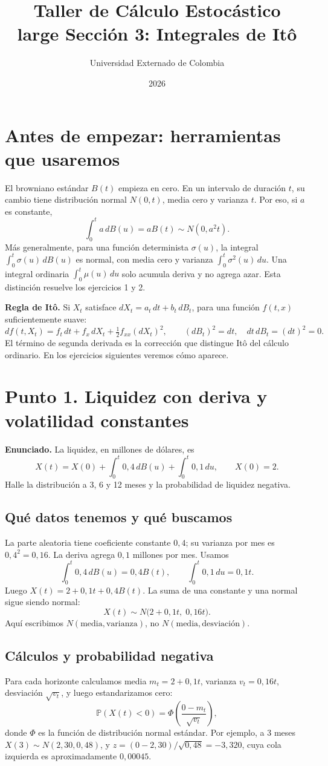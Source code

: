 \documentclass[11pt,a4paper]{article}
\title{\textbf{Taller de Cálculo Estocástico}\\large Sección 3: Integrales de Itô}
\author{Universidad Externado de Colombia}
\date{2026}
\begin{document}
\maketitle

\section*{Antes de empezar: herramientas que usaremos}
El browniano estándar \(B(t)\) empieza en cero. En un intervalo de duración \(t\), su cambio tiene distribución normal \(N(0,t)\), media cero y varianza \(t\). Por eso, si \(a\) es constante,
\[
\int_0^t a\,dB(u)=aB(t)\sim N(0,a^2t).
\]
Más generalmente, para una función determinista \(\sigma(u)\), la integral \(\int_0^t\sigma(u)\,dB(u)\) es normal, con media cero y varianza \(\int_0^t\sigma^2(u)\,du\). Una integral ordinaria \(\int_0^t\mu(u)\,du\) solo acumula deriva y no agrega azar. Esta distinción resuelve los ejercicios 1 y 2.

\textbf{Regla de Itô.} Si \(X_t\) satisface \(dX_t=a_t\,dt+b_t\,dB_t\), para una función \(f(t,x)\) suficientemente suave:
\[
df(t,X_t)=f_t\,dt+f_x\,dX_t+\tfrac12 f_{xx}(dX_t)^2,
\qquad (dB_t)^2=dt,\quad dt\,dB_t=(dt)^2=0.
\]
El término de segunda derivada es la corrección que distingue Itô del cálculo ordinario. En los ejercicios siguientes veremos cómo aparece.

\section*{Punto 1. Liquidez con deriva y volatilidad constantes}
\textbf{Enunciado.} La liquidez, en millones de dólares, es
\[
X(t)=X(0)+\int_0^t0{,}4\,dB(u)+\int_0^t0{,}1\,du,\qquad X(0)=2.
\]
Halle la distribución a 3, 6 y 12 meses y la probabilidad de liquidez negativa.

\subsection*{Qué datos tenemos y qué buscamos}
La parte aleatoria tiene coeficiente constante \(0{,}4\); su varianza por mes es \(0{,}4^2=0{,}16\). La deriva agrega \(0{,}1\) millones por mes. Usamos
\[
\int_0^t0{,}4\,dB(u)=0{,}4B(t),\qquad
\int_0^t0{,}1\,du=0{,}1t.
\]
Luego \(X(t)=2+0{,}1t+0{,}4B(t)\). La suma de una constante y una normal sigue siendo normal:
\[
X(t)\sim N\bigl(2+0{,}1t,\;0{,}16t\bigr).
\]
Aquí escribimos \(N(\text{media},\text{varianza})\), no \(N(\text{media},\text{desviación})\).

\subsection*{Cálculos y probabilidad negativa}
Para cada horizonte calculamos media \(m_t=2+0{,}1t\), varianza \(v_t=0{,}16t\), desviación \(\sqrt{v_t}\), y luego estandarizamos cero:
\[
\mathbb{P}(X(t)<0)=\Phi\left(\frac{0-m_t}{\sqrt{v_t}}\right),
\]
donde \(\Phi\) es la función de distribución normal estándar.
Por ejemplo, a 3 meses \(X(3)\sim N(2{,}30,0{,}48)\), y \(z=(0-2{,}30)/\sqrt{0{,}48}=-3{,}320\), cuya cola izquierda es aproximadamente \(0{,}00045\).
\end{document}
